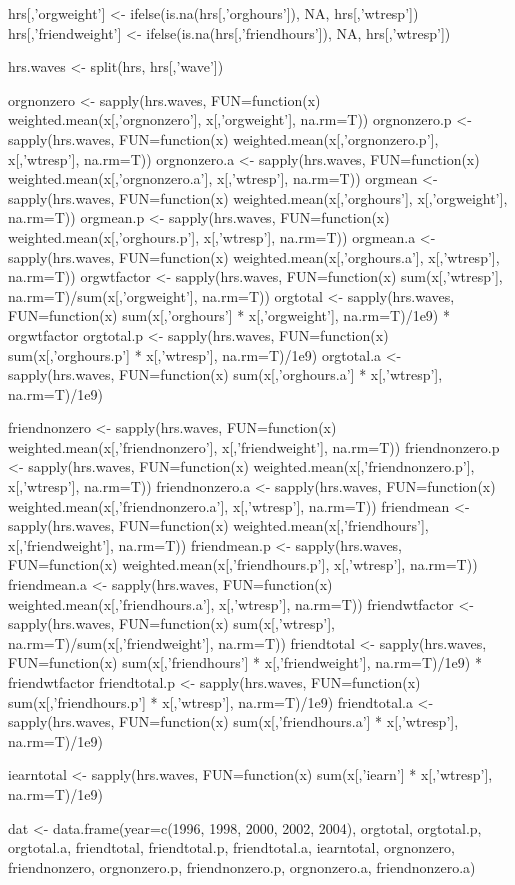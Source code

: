 \documentclass{article}
\begin{document}
\begin{Rcode}{}
hrs[,'orgweight'] <- ifelse(is.na(hrs[,'orghours']), NA, hrs[,'wtresp'])
hrs[,'friendweight'] <- ifelse(is.na(hrs[,'friendhours']), NA, hrs[,'wtresp'])

hrs.waves <- split(hrs, hrs[,'wave'])

orgnonzero <- sapply(hrs.waves, FUN=function(x) weighted.mean(x[,'orgnonzero'], x[,'orgweight'], na.rm=T))
orgnonzero.p <- sapply(hrs.waves, FUN=function(x) weighted.mean(x[,'orgnonzero.p'], x[,'wtresp'], na.rm=T))
orgnonzero.a <- sapply(hrs.waves, FUN=function(x) weighted.mean(x[,'orgnonzero.a'], x[,'wtresp'], na.rm=T))
orgmean <- sapply(hrs.waves, FUN=function(x) weighted.mean(x[,'orghours'], x[,'orgweight'], na.rm=T))
orgmean.p <- sapply(hrs.waves, FUN=function(x) weighted.mean(x[,'orghours.p'], x[,'wtresp'], na.rm=T))
orgmean.a <- sapply(hrs.waves, FUN=function(x) weighted.mean(x[,'orghours.a'], x[,'wtresp'], na.rm=T))
orgwtfactor <- sapply(hrs.waves, FUN=function(x) sum(x[,'wtresp'], na.rm=T)/sum(x[,'orgweight'], na.rm=T))
orgtotal <- sapply(hrs.waves, FUN=function(x) sum(x[,'orghours'] * x[,'orgweight'], na.rm=T)/1e9) * orgwtfactor
orgtotal.p <- sapply(hrs.waves, FUN=function(x) sum(x[,'orghours.p'] * x[,'wtresp'], na.rm=T)/1e9)
orgtotal.a <- sapply(hrs.waves, FUN=function(x) sum(x[,'orghours.a'] * x[,'wtresp'], na.rm=T)/1e9)

friendnonzero <- sapply(hrs.waves, FUN=function(x) weighted.mean(x[,'friendnonzero'], x[,'friendweight'], na.rm=T))
friendnonzero.p <- sapply(hrs.waves, FUN=function(x) weighted.mean(x[,'friendnonzero.p'], x[,'wtresp'], na.rm=T))
friendnonzero.a <- sapply(hrs.waves, FUN=function(x) weighted.mean(x[,'friendnonzero.a'], x[,'wtresp'], na.rm=T))
friendmean <- sapply(hrs.waves, FUN=function(x) weighted.mean(x[,'friendhours'], x[,'friendweight'], na.rm=T))
friendmean.p <- sapply(hrs.waves, FUN=function(x) weighted.mean(x[,'friendhours.p'], x[,'wtresp'], na.rm=T))
friendmean.a <- sapply(hrs.waves, FUN=function(x) weighted.mean(x[,'friendhours.a'], x[,'wtresp'], na.rm=T))
friendwtfactor <- sapply(hrs.waves, FUN=function(x) sum(x[,'wtresp'], na.rm=T)/sum(x[,'friendweight'], na.rm=T))
friendtotal <- sapply(hrs.waves, FUN=function(x) sum(x[,'friendhours'] * x[,'friendweight'], na.rm=T)/1e9) * friendwtfactor
friendtotal.p <- sapply(hrs.waves, FUN=function(x) sum(x[,'friendhours.p'] * x[,'wtresp'], na.rm=T)/1e9)
friendtotal.a <- sapply(hrs.waves, FUN=function(x) sum(x[,'friendhours.a'] * x[,'wtresp'], na.rm=T)/1e9)

iearntotal <- sapply(hrs.waves, FUN=function(x) sum(x[,'iearn'] * x[,'wtresp'], na.rm=T)/1e9)

dat <- data.frame(year=c(1996, 1998, 2000, 2002, 2004), orgtotal, orgtotal.p, orgtotal.a, friendtotal, friendtotal.p, friendtotal.a, iearntotal, orgnonzero, friendnonzero, orgnonzero.p, friendnonzero.p, orgnonzero.a, friendnonzero.a)
\end{Rcode}
\end{document}
